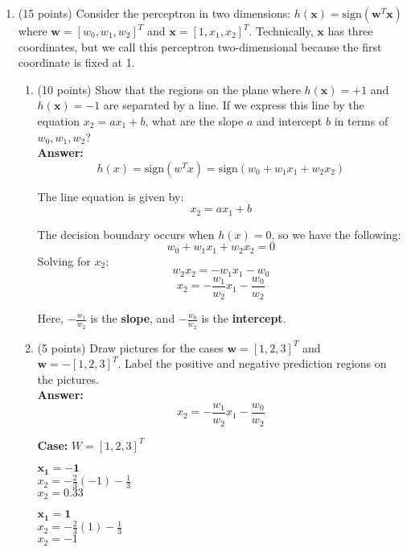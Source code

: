 \documentclass[11pt]{article}
\begin{document}
\begin{enumerate}
\item (15 points) Consider the perceptron in two dimensions:
$h(\boldsymbol x) = \mbox{sign}(\boldsymbol w^T \boldsymbol x)$
where $\boldsymbol w = [w_0, w_1, w_2]^T$ and $\boldsymbol x =
[1, x_1, x_2]^T$. Technically, $\boldsymbol x$ has three
coordinates, but we call this perceptron two-dimensional because
the first coordinate is fixed at 1.

\begin{enumerate}
    \item (10 points) Show that the regions on the plane where $h(\boldsymbol
    x) = +1$ and $h(\boldsymbol x) = -1$ are separated by a line.
    If we express this line by the equation $x_2 = ax_1 + b$,
    what are the slope $a$ and intercept $b$ in terms of $w_0, w_1, 
    w_2$?\\

    \textbf{Answer:}
\[h(x) = \text{sign}(w^T x) = \text{sign}(w_0 + w_1 x_1 + w_2 x_2)\]

The line equation is given by:
\[x_2 = a x_1 + b\]

The decision boundary occurs when $h(x) = 0$, so we have the following:
\[w_0 + w_1 x_1 + w_2 x_2 = 0\]
Solving for $x_2$:
\[w_2 x_2 = -w_1 x_1 - w_0\]
\[x_2 = - \frac{w_1}{w_2} x_1 - \frac{w_0}{w_2}\]

Here, $-\frac{w_1}{w_2}$ is the \textbf{slope}, and $-\frac{w_0}{w_2}$ is the \textbf{intercept}. \\

    \item (5 points) Draw pictures for the cases $\boldsymbol w=[1,2,3]^T$
    and $\boldsymbol w=-[1,2,3]^T$. Label the positive and negative
    prediction regions on the pictures.\\

        \textbf{Answer:}
\[x_2 = - \frac{w_1}{w_2} x_1 - \frac{w_0}{w_2}\]

\textbf{Case:} $W = [1, 2, 3]^T$\vspace{0.5cm}

\begin{minipage}{0.45\textwidth}
    \textbf{$\boldsymbol{x_1 = -1}$}\\
    $x_2 = - \frac{2}{3}(-1) - \frac{1}{3}$\\
    $x_2 = 0.33$
\end{minipage}
\hfill %
\begin{minipage}{0.45\textwidth}
    \textbf{$\boldsymbol{x_1 = 1}$}\\
    $x_2 = - \frac{2}{3}(1) - \frac{1}{3}$\\
    $x_2 = -1$
\end{minipage}


\end{enumerate}
\end{enumerate}
\end{document}
